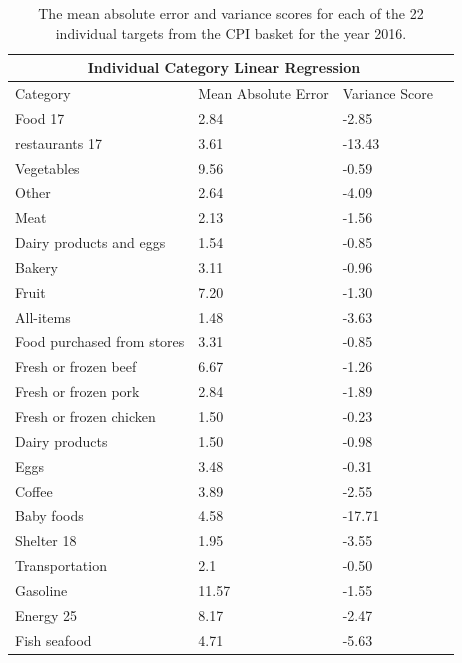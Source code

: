 \documentclass[12pt]{dalthesis}
\begin{document}
\begin{table}
	\caption{The mean absolute error and variance scores for each of the 22 individual targets from the CPI basket for the year 2016. }
	\label{tab:targets2016}
    \begin{tabular}{ |p{5cm}||p{4cm}|p{4cm}|p{4cm}|  }
       \hline
       \multicolumn{3}{|c|}{Individual Category Linear Regression } \\
       \hline
       Category    & Mean Absolute Error    & Variance Score \\
       \hline
       Food 17    & 2.84    & -2.85\\
       restaurants 17    & 3.61    & -13.43\\
       Vegetables    & 9.56    & -0.59\\
       Other    & 2.64    & -4.09\\
       Meat    & 2.13    & -1.56\\
       Dairy products and eggs    &1.54    & -0.85\\
       Bakery    & 3.11    & -0.96\\
       Fruit    & 7.20    & -1.30\\
       All-items    & 1.48    & -3.63\\
       Food purchased from stores    & 3.31    & -0.85\\
       Fresh or frozen beef    & 6.67    & -1.26\\
       Fresh or frozen pork    & 2.84    & -1.89\\
       Fresh or frozen chicken    & 1.50    & -0.23\\
       Dairy products    & 1.50    & -0.98\\
       Eggs    & 3.48    & -0.31\\
       Coffee    & 3.89    & -2.55\\
       Baby foods    & 4.58    & -17.71\\
       Shelter 18    & 1.95    & -3.55\\
       Transportation    & 2.1    & -0.50\\
       Gasoline    & 11.57    & -1.55\\
       Energy 25    & 8.17    & -2.47\\
       Fish seafood    & 4.71    & -5.63\\
       \hline
    \end{tabular}
\end{table}




\end{document}
